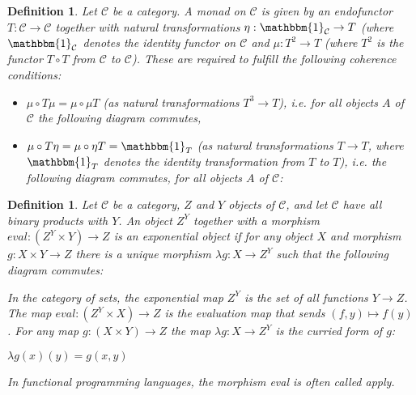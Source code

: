 \documentclass[11pt]{report}
\newcommand{\mcC}{\mathcal{C}}
\newtheorem{defn}[thm]{Definition} %
\begin{document}
\begin{defn}
  Let $\mcC$ be a category. A monad on $\mcC$ is given by an endofunctor $T: \mcC \to \mcC$ together with natural transformations $\eta: \mathbbm{1}_\mcC \to T$ (where $\mathbbm{1}_\mcC$ denotes the identity functor on $\mcC$ and
  $\mu: T^2 \to T$ (where $T^2$ is the functor $T \circ T$ from $\mcC$ to $\mcC$). These are required to fulfill the following coherence conditions:
  \begin{itemize}
  \item $\mu \circ T \mu = \mu \circ \mu T$ (as natural transformations $T^3 \to T$), i.e. for all objects $A$ of $\mcC$ the following diagram commutes,
    \begin{center}
    \end{center} 
  \item $\mu \circ T \eta = \mu \circ \eta T = \mathbbm{1}_T $ (as natural transformations  $T \to T$, where $\mathbbm{1}_T$ denotes the identity transformation from $T$ to $T$), i.e.
    the following diagram commutes, for all objects $A$ of $\mcC$:
    \begin{center}
    \end{center} 
  \end{itemize}
\end{defn}

\begin{defn}
  Let $\mcC$ be a category, $Z$ and $Y$ objects of $\mcC$, and let $\mcC$ have all binary products with $Y$. An object $Z^Y$ together with a morphism $eval: (Z^Y \times Y) \to Z$ is an exponential object if for any object $X$ and morphism $g: X \times Y \to Z$ there is a unique morphism $\lambda g : X \to Z^Y$ such that the following diagram commutes: 
  \begin{center}
  \end{center} 
  In the category of sets, the exponential map $Z^Y$ is the set of all functions $Y \to Z$. The map $eval:(Z^Y \times X) \to Z$ is the evaluation map that sends $(f, y) \mapsto f(y)$. For any map $g: (X \times Y) \to Z$ the map
  $\lambda g: X \to Z^Y$ is the curried form of $g$:
  \begin{center}
    $\lambda g(x)(y) = g(x,y)$
  \end{center}
  In functional programming languages, the morphism eval is often called apply.
\end{defn}
\end{document}

